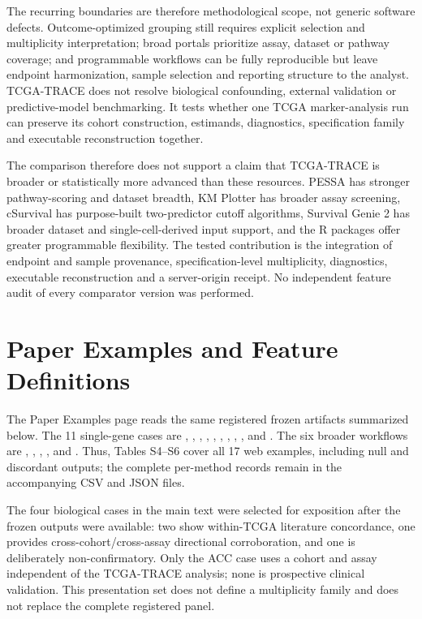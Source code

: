\documentclass[12pt]{article}
\begin{document}
The recurring boundaries are therefore methodological scope, not generic
software defects. Outcome-optimized grouping still requires explicit
selection and multiplicity interpretation; broad portals prioritize assay,
dataset or pathway coverage; and programmable workflows can be fully
reproducible but leave endpoint harmonization, sample selection and reporting
structure to the analyst. TCGA-TRACE does not resolve biological confounding,
external validation or predictive-model benchmarking. It tests whether one
TCGA marker-analysis run can preserve its cohort construction, estimands,
diagnostics, specification family and executable reconstruction together.

The comparison therefore does not support a claim that TCGA-TRACE is broader or
statistically more advanced than these resources. PESSA has stronger
pathway-scoring and dataset breadth, KM Plotter has broader assay screening,
cSurvival has purpose-built two-predictor cutoff algorithms, Survival Genie 2
has broader dataset and single-cell-derived input support, and the R packages
offer greater programmable flexibility. The tested contribution is the
integration of endpoint and sample provenance, specification-level
multiplicity, diagnostics, executable reconstruction and a server-origin
receipt. No independent feature audit of every comparator version was
performed.
\endgroup

\section*{Paper Examples and Feature Definitions}

The Paper Examples page reads the same registered frozen artifacts summarized
below. The
11 single-gene cases are ,
, ,
, ,
, ,
, ,
 and . The six broader workflows
are , ,
, ,
 and
. Thus, Tables S4--S6 cover all 17 web examples,
including null and discordant outputs; the complete per-method records remain
in the accompanying CSV and JSON files.

The four biological cases in the main text were selected for exposition after
the frozen outputs were available: two show within-TCGA literature concordance,
one provides cross-cohort/cross-assay directional corroboration, and one is
deliberately non-confirmatory. Only the ACC case uses a cohort and assay
independent of the TCGA-TRACE analysis; none is prospective clinical
validation. This presentation set does not define a multiplicity family and
does not replace the complete registered panel.
\end{document}
